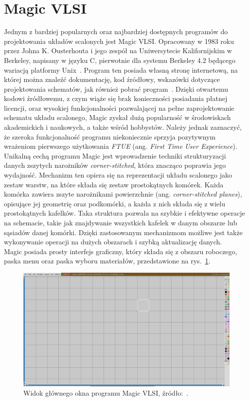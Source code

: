 \section{Magic VLSI}

Jednym z bardziej popularnych oraz najbardziej dostępnych programów do projektowania układów scalonych
jest Magic VLSI\@.
Opracowany w 1983 roku przez Johna K. Ousterhouta i jego zespół na Uniwersytecie Kalifornijskim w Berkeley,
napisany w języku C, pierwotnie dla systemu Berkeley 4.2 będącego wariacją platformy Unix~\cite{MAGIC_article}.
Program ten posiada własną stronę internetową, na której można znaleźć dokumentację, kod źródłowy,
wskazówki dotyczące projektowania schematów, jak również pobrać program~\cite{MAGIC_site}.
Dzięki otwartemu kodowi źródłowemu, z czym wiąże się brak konieczności posiadania płatnej licencji,
oraz wysokiej funkcjonalności pozwalającej na pełne zaprojektowanie schematu układu scalonego,
Magic zyskał dużą popularność
w środowiskach akademickich i naukowych, a także wśród hobbystów.
Należy jednak zaznaczyć, że szeroka funkcjonalność programu
niekoniecznie sprzyja pozytywnym wrażeniom pierwszego użytkowania \textit{FTUE}
(ang. \textit{First Time User Experience}).
\newpage
\indent Unikalną cechą programu Magic jest wprowadzenie techniki strukturyzacji danych
zszytych narożników \textit{corner-stitched},
która znacząco poprawia jego wydajność.
Mechanizm ten opiera się na reprezentacji układu scalonego jako zestaw warstw,
na które składa się zestaw prostokątnych komórek.
Każda komórka zawiera zszyte narożnikami powierzchnie (ang. \textit{corner-stitched planes}),
opisujące jej geometrię oraz podkomórki, a każda z nich składa się z wielu prostokątnych kafelków.
Taka struktura pozwala na szybkie i efektywne operacje na schemacie,
takie jak znajdywanie wszystkich kafelek w danym obszarze lub sąsiadów danej komórki.
Dzięki zastosowanym mechanizmom możliwe jest także wykonywanie operacji na dużych obszarach
i szybką aktualizację danych.\\
\indent Magic posiada prosty interfejs graficzny,
który składa się z obszaru roboczego, paska menu oraz paska wyboru materiałów,
przedstawione na rys.~\ref{fig:magic_okno}.

\begin{figure}[h]
    \centering
    \includegraphics[width=.9\textwidth]{chapters/chapter2/img/magic_okno}
    \caption[Widok głównego okna programu Magic VLSI.]{Widok głównego okna programu Magic VLSI, źródło:~\cite{MAGIC_site}.}
    \label{fig:magic_okno}
\end{figure}

